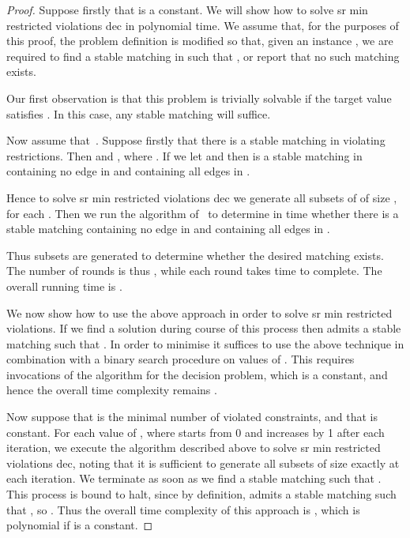\documentclass[preprint,12pt]{elsarticle}
\begin{document}
\begin{proof}
Suppose firstly that  is a constant.  We will show how to solve {\sc sr min restricted violations dec} in polynomial time.  We assume that, for the purposes of this proof, the problem definition is modified so that, given an instance , we are required to find a stable matching  in  such that , or report that no such matching exists.

Our first observation is that this problem is trivially solvable if the target value  satisfies .  In this case, any stable matching will suffice.

Now assume that~.  Suppose firstly that there is a stable matching  in  violating  restrictions.  Then  and , where .  If we let  and  then  is a stable matching in  containing no edge in  and containing all edges in .

Hence to solve {\sc sr min restricted violations dec} we generate all subsets  of  of size , for each .  Then we run the algorithm of~\cite{FIM07} to determine in  time whether there is a stable matching containing no edge in  and containing all edges in .  

Thus  subsets are generated to determine whether the desired matching exists.  The number of rounds is thus , while each round takes  time to complete.  The overall running time is .

We now show how to use the above approach in order to solve {\sc sr min restricted violations}.  If we find a solution during course of this process then  admits a stable matching  such that .  In order to minimise  it suffices to use the above technique in combination with a binary search procedure on values of .  This requires  invocations of the algorithm for the decision problem, which is a constant, and hence the overall time complexity remains .
\medskip

Now suppose that  is the minimal number of violated constraints, and that  is constant. For each value of , where  starts from 0 and increases by 1 after each iteration, we execute the algorithm described above to solve {\sc sr min restricted violations dec}, noting that it is sufficient to generate all subsets of size exactly  at each iteration.  We terminate as soon as we find a stable matching  such that 
 .  This process is bound to halt, since by definition,  admits a stable matching  such that , so . Thus the overall time complexity of this approach is , which is polynomial if  is a constant.
\end{proof}
\end{document}

